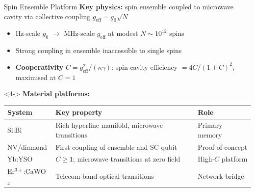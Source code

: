 \documentclass[10pt]{beamer}
\newcommand{\lighthline}{\arrayrulecolor{gray!35}\hline\arrayrulecolor{black}}
\begin{document}
\begin{frame}{Spin Ensemble Platform}
    \textbf{Key physics:} spin ensemble coupled to microwave cavity via collective coupling $g_\mathrm{eff} = g_0\sqrt{N}$
    \begin{itemize}
        \item<1-> Hz-scale $g_0$ $\to$ MHz-scale $g_\mathrm{eff}$ at modest $N\sim10^{12}$ spins
        \item<2-> Strong coupling in ensemble inaccessible to single spins
        \item<3-> \textbf{Cooperativity} $C = g_\mathrm{eff}^2/(\kappa\gamma)$: spin-cavity efficiency $= 4C/(1+C)^2$, maximised at $C = 1$
    \end{itemize}
    \vspace{0.1cm}
    \begin{uncoverenv}<4->
    \textbf{Material platforms:}
    \begin{center}
    \scriptsize
    \renewcommand{\arraystretch}{1.2}
    \begin{tabular}{lll}
        \toprule
        \textbf{System} & \textbf{Key property} & \textbf{Role} \\
        \midrule
        Si:Bi & Rich hyperfine manifold, microwave transitions & Primary memory \\
        \lighthline
        NV/diamond & First coupling of ensemble and SC qubit & Proof of concept \\
        \lighthline
        Yb:YSO & $C\geq1$; microwave transitions at zero field & High-$C$ platform \\
        \lighthline
        Er$^{3+}$:CaWO$_4$ & Telecom-band optical transitions & Network bridge \\
        \bottomrule
    \end{tabular}
    \end{center}
    \end{uncoverenv}
\end{frame}
\end{document}
